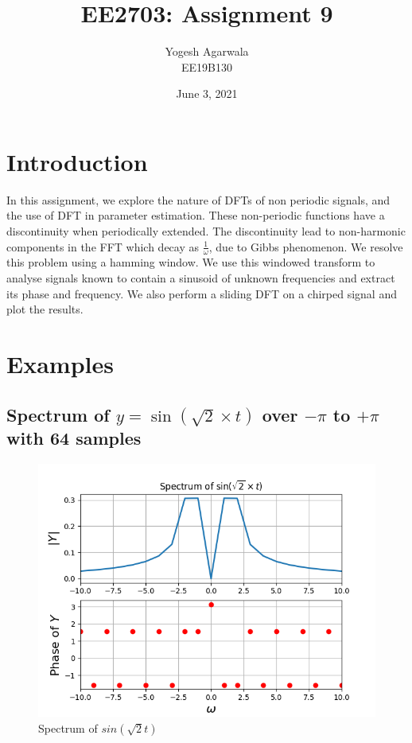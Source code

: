 \documentclass{article}
\title{EE2703: Assignment 9}
\author{Yogesh Agarwala \\ EE19B130}
\date{June 3, 2021}
\begin{document}
\maketitle

\section*{Introduction}
In this assignment, we explore the nature of DFTs of non periodic signals,
and the use of DFT in parameter estimation. These non-periodic functions have a discontinuity when periodically extended. The discontinuity lead to non-harmonic components in the FFT which decay as
\(\frac{1}{\omega}\), due to Gibbs phenomenon. We resolve this problem using a hamming window. We use this windowed transform to analyse signals known to contain a sinusoid of unknown frequencies and extract its phase and frequency. We also perform a sliding DFT on a chirped signal and plot the results.

\clearpage

\section {Examples}

\subsection{Spectrum of $y=\sin\left(\sqrt{2} \times t\right)$ over $-\pi$ to $+\pi$ with 64 samples}

\begin{figure}[h!]
\centering
\includegraphics[scale=0.5]{Figure_1.png}
\caption{Spectrum of $sin(\sqrt{2}t)$}
\label{fig:universe}
\end{figure}
\end{document}
